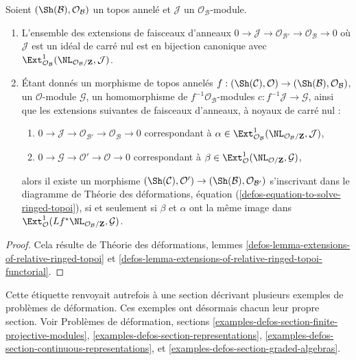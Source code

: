 \begin{lemma}
\label{lemma-extensions-of-ringed-topoi}
Soient $(\Sh(\mathcal{B}), \mathcal{O}_\mathcal{B})$ un topos annelé
et $\mathcal{J}$ un $\mathcal{O}_\mathcal{B}$-module.
\begin{enumerate}
\item L'ensemble des extensions de faisceaux d'anneaux
$0 \to \mathcal{J} \to \mathcal{O}_{\mathcal{B}'} \to
\mathcal{O}_\mathcal{B} \to 0$
où $\mathcal{J}$ est un idéal de carré nul est en bijection canonique avec
$\Ext^1_{\mathcal{O}_\mathcal{B}}(
\NL_{\mathcal{O}_\mathcal{B}/\mathbf{Z}}, \mathcal{J})$.
\item Étant donnés un morphisme de topos annelés
$f : (\Sh(\mathcal{C}), \mathcal{O}) \to
(\Sh(\mathcal{B}), \mathcal{O}_\mathcal{B})$, un $\mathcal{O}$-module
$\mathcal{G}$, un homomorphisme de $f^{-1}\mathcal{O}_\mathcal{B}$-modules
$c : f^{-1}\mathcal{J} \to \mathcal{G}$, ainsi que les extensions suivantes
de faisceaux d'anneaux, à noyaux de carré nul :
\begin{enumerate}
\item[(a)] $0 \to \mathcal{J} \to \mathcal{O}_{\mathcal{B}'} \to
\mathcal{O}_\mathcal{B} \to 0$ correspondant à
$\alpha \in \Ext^1_{\mathcal{O}_\mathcal{B}}(
\NL_{\mathcal{O}_\mathcal{B}/\mathbf{Z}}, \mathcal{J})$,
\item[(b)] $0 \to \mathcal{G} \to \mathcal{O}' \to \mathcal{O} \to 0$
correspondant à
$\beta \in \Ext^1_\mathcal{O}(\NL_{\mathcal{O}/\mathbf{Z}}, \mathcal{G})$,
\end{enumerate}
alors il existe un morphisme $(\Sh(\mathcal{C}), \mathcal{O}') \to
(\Sh(\mathcal{B}), \mathcal{O}_{\mathcal{B}'})$ s'inscrivant dans
le diagramme de Théorie des déformations, équation (\ref{defos-equation-to-solve-ringed-topoi}),
si et seulement si $\beta$ et $\alpha$ ont la même image dans
$\Ext^1_\mathcal{O}(
Lf^*\NL_{\mathcal{O}_\mathcal{B}/\mathbf{Z}}, \mathcal{G})$.
\end{enumerate}
\end{lemma}

\begin{proof}
Cela résulte de Théorie des déformations, lemmes
\ref{defos-lemma-extensions-of-relative-ringed-topoi} et
\ref{defos-lemma-extensions-of-relative-ringed-topoi-functorial}.
\end{proof}

\begin{remark}
\label{remark-examples-formal-defos}
Cette étiquette renvoyait autrefois à une section décrivant plusieurs exemples
de problèmes de déformation. Ces exemples ont désormais chacun leur propre section.
Voir Problèmes de déformation, sections
\ref{examples-defos-section-finite-projective-modules},
\ref{examples-defos-section-representations},
\ref{examples-defos-section-continuous-representations}, et
\ref{examples-defos-section-graded-algebras}.
\end{remark}

